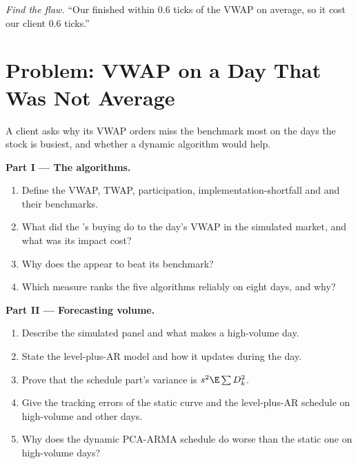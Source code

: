 \begin{exercise}[$\star\star\star$]\label{exo:mx:benchmark-algorithms:8}
\emph{Find the flaw.} ``Our  finished within 0.6 ticks of the VWAP on average, so it cost our client 0.6 ticks.''
\end{exercise}

\section{Problem: VWAP on a Day That Was Not Average}

\begin{problem}\label{pb:mx:benchmark-algorithms:1}
A client asks why its VWAP orders miss the benchmark most on the days the stock is busiest, and whether a dynamic algorithm would help.

\medskip\noindent\textbf{Part I --- The algorithms.}
\begin{enumerate}
\item Define the VWAP, TWAP, participation, implementation-shortfall and  and their benchmarks.
\item What did the 's buying do to the day's VWAP in the simulated market, and what was its impact cost?
\item Why does the  appear to beat its benchmark?
\item Which measure ranks the five algorithms reliably on eight days, and why?
\end{enumerate}

\medskip\noindent\textbf{Part II --- Forecasting volume.}
\begin{enumerate}[resume]
\item Describe the simulated panel and what makes a high-volume day.
\item State the level-plus-AR model and how it updates during the day.
\item Prove that the schedule part's variance is $s^2\E\sum D_k^2$.
\item Give the tracking errors of the static curve and the level-plus-AR schedule on high-volume and other days.
\item Why does the dynamic PCA-ARMA schedule do worse than the static one on high-volume days?
\end{enumerate}


\end{problem}
